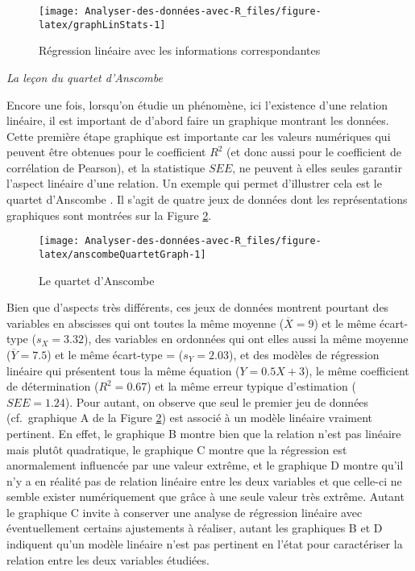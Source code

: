 \documentclass[
  french,
]{book}
\begin{document}
\begin{figure}

{\centering \texttt{[image: Analyser-des-données-avec-R\_files/figure-latex/graphLinStats-1]} 

}

\caption{Régression linéaire avec les informations correspondantes}\label{fig:graphLinStats}
\end{figure}

\emph{La leçon du quartet d'Anscombe}

Encore une fois, lorsqu'on étudie un phénomène, ici l'existence d'une relation linéaire, il est important de d'abord faire un graphique montrant les données. Cette première étape graphique est importante car les valeurs numériques qui peuvent être obtenues pour le coefficient \(R^2\) (et donc aussi pour le coefficient de corrélation de Pearson), et la statistique \(SEE\), ne peuvent à elles seules garantir l'aspect linéaire d'une relation. Un exemple qui permet d'illustrer cela est le quartet d'Anscombe \autocite*{anscombeGraphsStatisticalAnalysis1973}. Il s'agit de quatre jeux de données dont les représentations graphiques sont montrées sur la Figure \ref{fig:anscombeQuartetGraph}.

\begin{figure}

{\centering \texttt{[image: Analyser-des-données-avec-R\_files/figure-latex/anscombeQuartetGraph-1]} 

}

\caption{Le quartet d'Anscombe}\label{fig:anscombeQuartetGraph}
\end{figure}

Bien que d'aspects très différents, ces jeux de données montrent pourtant des variables en abscisses qui ont toutes la même moyenne (\(\overline{X} = 9\)) et le même écart-type (\(s_{X} = 3.32\)), des variables en ordonnées qui ont elles aussi la même moyenne (\(\overline{Y} = 7.5\)) et le même écart-type = (\(s_{Y} = 2.03\)), et des modèles de régression linéaire qui présentent tous la même équation (\(Y = 0.5X + 3\)), le même coefficient de détermination (\(R^2 = 0.67\)) et la même erreur typique d'estimation (\(SEE = 1.24\)). Pour autant, on observe que seul le premier jeu de données (cf.~graphique A de la Figure \ref{fig:anscombeQuartetGraph}) est associé à un modèle linéaire vraiment pertinent. En effet, le graphique B montre bien que la relation n'est pas linéaire mais plutôt quadratique, le graphique C montre que la régression est anormalement influencée par une valeur extrême, et le graphique D montre qu'il n'y a en réalité pas de relation linéaire entre les deux variables et que celle-ci ne semble exister numériquement que grâce à une seule valeur très extrême. Autant le graphique C invite à conserver une analyse de régression linéaire avec éventuellement certains ajustements à réaliser, autant les graphiques B et D indiquent qu'un modèle linéaire n'est pas pertinent en l'état pour caractériser la relation entre les deux variables étudiées.
\end{document}
